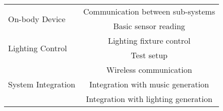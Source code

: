     \begin{tabular}{|l|c|}
        \hline
        \multirow{2}{7em}{On-body Device}     & \cellcolor{green!25}Communication between sub-systems           \\ \cline{2-2}
        ~                                     & \cellcolor{green!25}Basic sensor reading                        \\ \hline \hline
        \multirow{2}{7em}{Lighting Control}   & \cellcolor{green!25}Lighting fixture control                    \\ \cline{2-2}
        ~                                     & \cellcolor{green!25}Test setup                                  \\ \hline \hline
        \multirow{3}{7em}{System Integration} & \cellcolor{green!25}Wireless communication                      \\ \cline{2-2}
        ~                                     & \cellcolor{green!25}Integration with music generation           \\ \cline{2-2}
        ~                                     & \cellcolor{green!25}Integration with lighting generation        \\ \hline
    \end{tabular}
